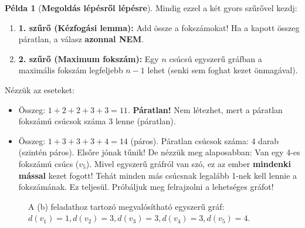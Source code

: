 \documentclass[a4paper,12pt]{article}
\newcommand{\textbfr}[1]{\textbf{\textcolor{bvred}{#1}}} %
\theoremstyle{definition} %
\newtheorem*{example}{Példa}
\begin{document}
\begin{example}[\textbf{Megoldás lépésről lépésre}]
Mindig ezzel a két gyors szűrővel kezdj:
\begin{enumerate}
    \item \textbf{1. szűrő (Kézfogási lemma):} Add össze a fokszámokat! Ha a kapott összeg páratlan, a válasz \textbf{azonnal NEM}.
    \item \textbf{2. szűrő (Maximum fokszám):} Egy $n$ csúcsú egyszerű gráfban a maximális fokszám legfeljebb $n-1$ lehet (senki sem foghat kezet önmagával).
\end{enumerate}

Nézzük az eseteket:
\begin{itemize}[leftmargin=2em]
    \item[(a)] Összeg: $1 + 2 + 2 + 3 + 3 = 11$. \textbfr{Páratlan!} Nem létezhet, mert a páratlan fokszámú csúcsok száma 3 lenne (páratlan).
    \item[(b)] Összeg: $1 + 3 + 3 + 3 + 4 = 14$ (páros). Páratlan csúcsok száma: 4 darab (szintén páros). Elsőre jónak tűnik! De nézzük meg alaposabban:
    Van egy 4-es fokszámú csúcs ($v_5$). Mivel egyszerű gráfról van szó, ez az ember \textbf{mindenki mással} kezet fogott! Tehát minden más csúcsnak legalább 1-nek kell lennie a fokszámának. Ez teljesül.
    Próbáljuk meg felrajzolni a lehetséges gráfot!
\end{itemize}

\begin{figure}[H]
    \centering
    \caption{A (b) feladathoz tartozó megvalósítható egyszerű gráf: $d(v_1)=1, d(v_2)=3, d(v_3)=3, d(v_4)=3, d(v_5)=4$.}
    \label{fig:solution_b}
\end{figure}


\end{example}
\end{document}
